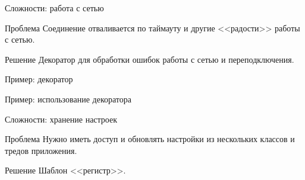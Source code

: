 \documentclass{beamer}
\begin{document}
\begin{frame}{Сложности: работа с сетью}

\begin{block}{Проблема}
Соединение отваливается по таймауту и другие <<радости>> работы с сетью.
\end{block}

\begin{block}{Решение}
Декоратор для обработки ошибок работы с сетью и переподключения.
\end{block}
\end{frame}

\begin{frame}{Пример: декоратор}

\end{frame}


\begin{frame}{Пример: использование декоратора}

\end{frame}


\begin{frame}{Сложности: хранение настроек}

\begin{block}{Проблема}
Нужно иметь доступ и обновлять настройки из нескольких классов и тредов приложения.
\end{block}

\begin{block}{Решение}
Шаблон <<регистр>>.
\end{block}
\end{frame}
\end{document}
